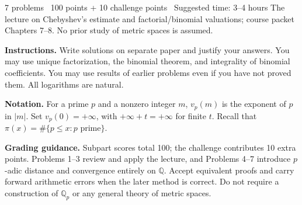 
\newcommand{\Q}{\mathbb Q}
\newcommand{\setname}{Valuations and $p$-adic distance}

{7 problems \textbar\ 100 points + 10 challenge points
\textbar\ Suggested time: 3--4 hours}
{The lecture on Chebyshev's estimate and factorial/binomial valuations;
course packet Chapters 7--8. No prior study of metric spaces is assumed.}

\textbf{Instructions.} Write solutions on separate paper and justify your
answers. You may use unique factorization, the binomial theorem, and
integrality of binomial coefficients. You may use results of earlier problems
even if you have not proved them. All logarithms are natural.

\textbf{Notation.} For a prime $p$ and a nonzero integer $m$, $v_p(m)$ is
the exponent of $p$ in $|m|$. Set $v_p(0)=+\infty$, with
$+\infty+t=+\infty$ for finite $t$. Recall that
$\pi(x)=\#\{p\le x:p\text{ prime}\}$.

\ifsolutions
\textbf{Grading guidance.} Subpart scores total 100; the challenge contributes
10 extra points. Problems 1--3 review and apply the lecture, and Problems
4--7 introduce $p$-adic distance and convergence entirely on $\Q$.
Accept equivalent proofs and carry forward arithmetic errors when the later
method is correct. Do not require a construction of $\Q_p$ or any general
theory of metric spaces.
\fi


